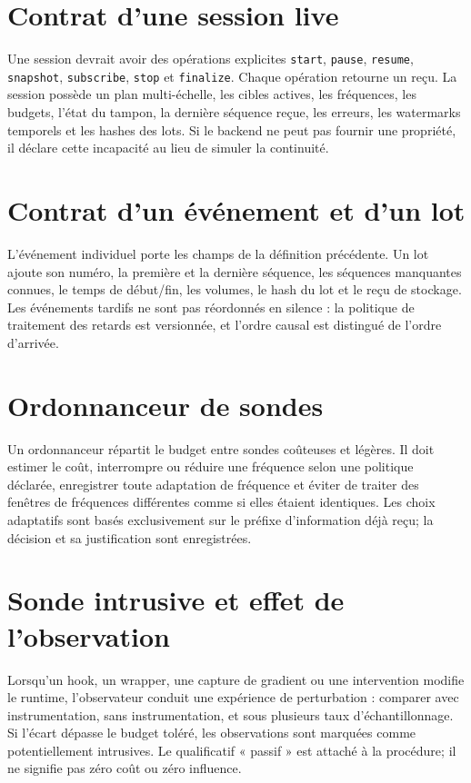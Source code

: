 \documentclass[11pt,oneside]{book}
\theoremstyle{definition}
\theoremstyle{remark}
\newcommand{\1}{\mathbf 1}
\begin{document}
\section{Contrat d'une session live}
Une session devrait avoir des opérations explicites \texttt{start}, \texttt{pause}, \texttt{resume}, \texttt{snapshot}, \texttt{subscribe}, \texttt{stop} et \texttt{finalize}. Chaque opération retourne un reçu. La session possède un plan multi-échelle, les cibles actives, les fréquences, les budgets, l'état du tampon, la dernière séquence reçue, les erreurs, les watermarks temporels et les hashes des lots. Si le backend ne peut pas fournir une propriété, il déclare cette incapacité au lieu de simuler la continuité.

\section{Contrat d'un événement et d'un lot}
L'événement individuel porte les champs de la définition précédente. Un lot ajoute son numéro, la première et la dernière séquence, les séquences manquantes connues, le temps de début/fin, les volumes, le hash du lot et le reçu de stockage. Les événements tardifs ne sont pas réordonnés en silence : la politique de traitement des retards est versionnée, et l'ordre causal est distingué de l'ordre d'arrivée.

\section{Ordonnanceur de sondes}
Un ordonnanceur répartit le budget entre sondes coûteuses et légères. Il doit estimer le coût, interrompre ou réduire une fréquence selon une politique déclarée, enregistrer toute adaptation de fréquence et éviter de traiter des fenêtres de fréquences différentes comme si elles étaient identiques. Les choix adaptatifs sont basés exclusivement sur le préfixe d'information déjà reçu; la décision et sa justification sont enregistrées.

\section{Sonde intrusive et effet de l'observation}
Lorsqu'un hook, un wrapper, une capture de gradient ou une intervention modifie le runtime, l'observateur conduit une expérience de perturbation : comparer avec instrumentation, sans instrumentation, et sous plusieurs taux d'échantillonnage. Si l'écart dépasse le budget toléré, les observations sont marquées comme potentiellement intrusives. Le qualificatif « passif » est attaché à la procédure; il ne signifie pas zéro coût ou zéro influence.
\end{document}
